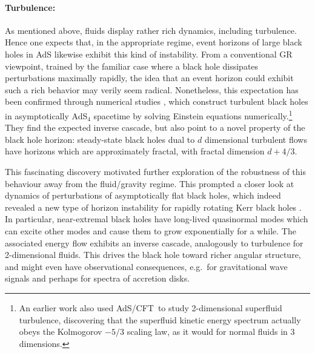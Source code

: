 \documentclass[12pt,a4paper]{article}
\def\AC{AdS/CFT}
\begin{document}
\paragraph{Turbulence:}  %
As mentioned above,
fluids display rather rich dynamics, including turbulence.
Hence one expects that, in the appropriate regime, event horizons of large black holes in AdS likewise exhibit this kind of instability.  From a conventional GR viewpoint, trained by the familiar case where a black hole dissipates perturbations maximally rapidly, 
the idea that an  event horizon could exhibit such a rich behavior may verily seem  radical.   Nonetheless, this expectation has been confirmed through numerical studies \cite{Adams:2013vsa}, which construct turbulent black holes in asymptotically AdS$_4$ spacetime by  solving Einstein equations numerically.\footnote{
An earlier work \cite{Adams:2012pj} also used \AC\ to study 2-dimensional superfluid turbulence, discovering that the superfluid kinetic energy spectrum actually obeys the Kolmogorov $-5/3$ scaling law, as it would for normal fluids in 3 dimensions.
}  They find the expected inverse cascade, but also point to a novel property of the black hole horizon:  steady-state black holes dual to $d$ dimensional turbulent flows have horizons which are approximately fractal,  with fractal dimension $d + 4/3$.


This fascinating discovery motivated further exploration of the  robustness of this behaviour away from the fluid/gravity regime.  This prompted a closer look at dynamics of perturbations of asymptotically flat black holes, which indeed revealed a new type of horizon instability for rapidly rotating Kerr black holes \cite{Yang:2014tla}.  In particular, near-extremal black holes have long-lived quasinormal modes which can excite other modes and cause them to grow exponentially for a while.  The associated energy flow exhibits an inverse cascade, analogously to turbulence for 2-dimensional fluids.  This drives the black hole toward richer angular structure, and might even have observational consequences, e.g.\ for gravitational wave signals and perhaps for spectra of accretion disks. 
\end{document}
